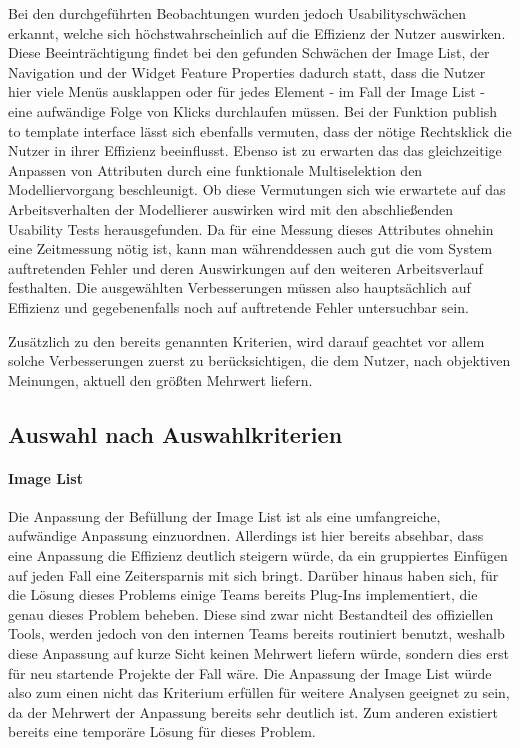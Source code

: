 Bei den durchgeführten Beobachtungen wurden jedoch Usabilityschwächen erkannt, welche sich höchstwahrscheinlich auf die Effizienz der Nutzer auswirken.
Diese Beeinträchtigung findet bei den gefunden Schwächen der Image List, der Navigation und der Widget Feature Properties dadurch statt, dass die Nutzer hier viele Menüs ausklappen oder für jedes Element - im Fall der Image List -  eine aufwändige Folge von Klicks durchlaufen müssen.
Bei der Funktion \glqq publish to template interface\grqq{} lässt sich ebenfalls vermuten, dass der nötige Rechtsklick die Nutzer in ihrer Effizienz beeinflusst.
Ebenso ist zu erwarten das das gleichzeitige Anpassen von Attributen durch eine funktionale Multiselektion den Modelliervorgang beschleunigt.
Ob diese Vermutungen sich wie erwartete auf das Arbeitsverhalten der Modellierer auswirken wird mit den abschließenden Usability Tests herausgefunden.
Da für eine Messung dieses Attributes ohnehin eine Zeitmessung nötig ist, kann man währenddessen auch gut die vom System auftretenden Fehler und deren Auswirkungen auf den weiteren Arbeitsverlauf festhalten.
Die ausgewählten Verbesserungen müssen also hauptsächlich auf Effizienz und gegebenenfalls noch auf auftretende Fehler untersuchbar sein.

Zusätzlich zu den bereits genannten Kriterien, wird darauf geachtet  vor allem solche Verbesserungen zuerst zu berücksichtigen, die dem Nutzer, nach objektiven Meinungen, aktuell den größten Mehrwert liefern.

\subsection{Auswahl nach Auswahlkriterien}

\paragraph{Image List}
Die Anpassung der Befüllung der Image List ist als eine umfangreiche, aufwändige Anpassung einzuordnen.
Allerdings ist hier bereits absehbar, dass eine Anpassung die Effizienz deutlich steigern würde, da ein gruppiertes Einfügen auf jeden Fall eine Zeitersparnis mit sich bringt.
Darüber hinaus haben sich, für die Lösung dieses Problems einige Teams bereits Plug-Ins implementiert, die genau dieses Problem beheben. 
Diese sind zwar nicht Bestandteil des offiziellen Tools, werden jedoch von den internen Teams bereits routiniert benutzt, weshalb diese Anpassung auf kurze Sicht keinen Mehrwert liefern würde, sondern dies erst für neu startende Projekte der Fall wäre.
Die Anpassung der Image List würde also zum einen nicht das Kriterium erfüllen für weitere Analysen geeignet zu sein, da der Mehrwert der Anpassung bereits sehr deutlich ist.
Zum anderen existiert bereits eine temporäre Lösung für dieses Problem.


